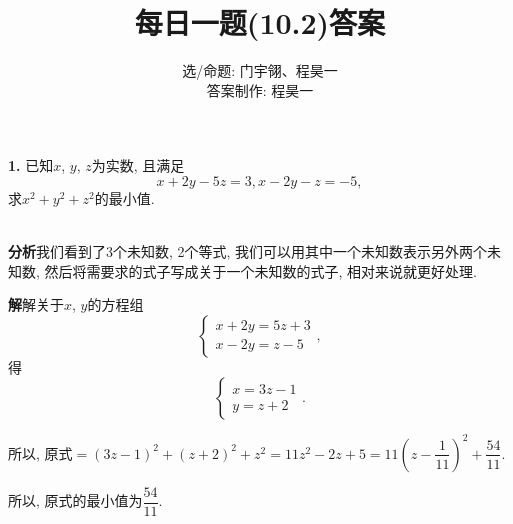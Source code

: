 \documentclass{article}
\title{每日一题(10.2)答案}
\author{\kaishu 选/命题: 门宇翎、程昊一\\\kaishu 答案制作: 程昊一}
\begin{document}
\maketitle
\textbf{1. }{\kaishu 已知$x$, $y$, $z$为实数, 且满足
\[x+2y-5z=3, x-2y-z=-5,\]
求$x^2+y^2+z^2$的最小值.\\
}\\\par
\textbf{分析}\quad 我们看到了3个未知数, 2个等式, 我们可以用其中一个未知数表示另外两个未知数, 然后将需要求的式子写成关于一个未知数的式子, 相对来说就更好处理.\\\par
\textbf{解}\quad 解关于$x$, $y$的方程组
\[\begin{cases}
	x+2y=5z+3\\x-2y=z-5
\end{cases},\]
得
\[\begin{cases}
	x=3z-1\\y=z+2
\end{cases}.\]\par
所以, 原式$=(3z-1)^2+(z+2)^2+z^2=11z^2-2z+5=11\left(z-\dfrac{1}{11}\right)^2+\dfrac{54}{11}.$\par
所以, 原式的最小值为$\dfrac{54}{11}.$\\\par
\end{document}
